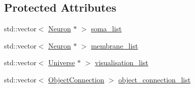 \subsection*{Protected Attributes}
\begin{DoxyCompactItemize}
\item 
std\+::vector$<$ \mbox{\hyperlink{classNeuron}{Neuron}} $\ast$ $>$ \mbox{\hyperlink{classNeuron_abb3745c6a8727f4ceb8db9e2258b90b5}{soma\+\_\+list}}
\item 
std\+::vector$<$ \mbox{\hyperlink{classNeuron}{Neuron}} $\ast$ $>$ \mbox{\hyperlink{classNeuron_a878a5a42025ba8205adeb9a50b2c1457}{membrane\+\_\+list}}
\item 
std\+::vector$<$ \mbox{\hyperlink{classUniverse}{Universe}} $\ast$ $>$ \mbox{\hyperlink{classNeuron_a00b1e2e5f9d224759df1aa54093092ba}{visualisation\+\_\+list}}
\item 
std\+::vector$<$ \mbox{\hyperlink{structNeuron_1_1ObjectConnection}{Object\+Connection}} $>$ \mbox{\hyperlink{classNeuron_a8259952162df5c8bb66eb78126feafe6}{object\+\_\+connection\+\_\+list}}
\end{DoxyCompactItemize}
